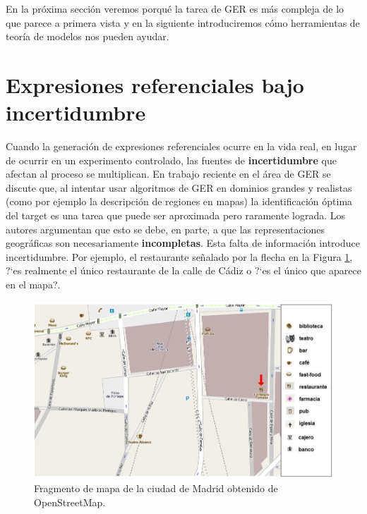 En la pr\'oxima secci\'on veremos porqu\'e la tarea de GER es m\'as compleja de lo que parece a primera vista y en la siguiente introduciremos c\'omo herramientas de teor\'ia de modelos nos pueden ayudar.

\section{Expresiones referenciales bajo incertidumbre}
\label{sec:gre-incertidumbre}


Cuando la generaci\'on de expresiones referenciales ocurre en la vida real, en lugar de ocurrir en un experimento controlado, las fuentes de \textbf{incertidumbre} que afectan al proceso se multiplican. En trabajo reciente en el \'area de GER \cite{turner2009,deemter16} se discute que, al intentar usar algoritmos de GER en dominios grandes y realistas (como por ejemplo la descripci\'on de regiones en mapas) la identificaci\'on \'optima del target es una tarea que puede ser aproximada pero raramente lograda. Los autores argumentan que esto se debe, en parte, a que las representaciones geogr\'aficas son necesariamente \textbf{incompletas}. Esta falta de informaci\'on introduce incertidumbre. Por ejemplo, el restaurante se\~nalado por la flecha en la Figura \ref{target_mapa}, ?`es realmente el \'unico restaurante de la calle de C\'adiz o ?`es el \'unico que aparece en el mapa?.

\begin{figure}[h]
\centering
\includegraphics[width=\textwidth]{images/corpus/mapa15.png}
\caption{Fragmento de mapa de la ciudad de Madrid obtenido de OpenStreetMap.}
\label{target_mapa}
\end{figure}

